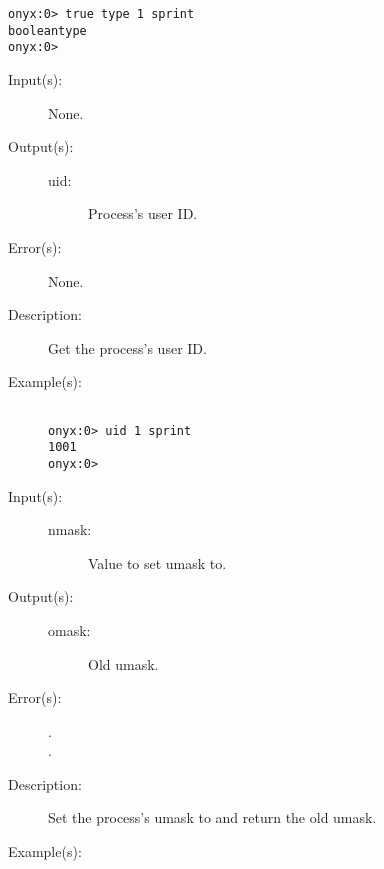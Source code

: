 \begin{description}
\begin{description}
\begin{verbatim}
onyx:0> true type 1 sprint
booleantype
onyx:0>
		\end{verbatim}
	\end{description}
\label{systemdict:uid}
\item[{\onyxop{--}{uid}{uid}}: ]
	\begin{description}\item[]
	\item[Input(s): ] None.
	\item[Output(s): ]
		\begin{description}\item[]
		\item[uid: ]
			Process's user ID.
		\end{description}
	\item[Error(s): ] None.
	\item[Description: ]
		Get the process's user ID.
	\item[Example(s): ]\begin{verbatim}

onyx:0> uid 1 sprint
1001
onyx:0>
		\end{verbatim}
	\end{description}
\label{systemdict:umask}
\item[{\onyxop{nmask}{umask}{omask}}: ]
	\begin{description}\item[]
	\item[Input(s): ]
		\begin{description}\item[]
		\item[nmask: ]
			Value to set umask to.
		\end{description}
	\item[Output(s): ]
		\begin{description}\item[]
		\item[omask: ]
			Old umask.
		\end{description}
	\item[Error(s): ]
		\begin{description}\item[]
		\item[.]
		\item[.]
		\end{description}
	\item[Description: ]
		Set the process's umask to  and return the old
		umask.
	\item[Example(s): ]\begin{verbatim}


\end{verbatim}
\end{description}
\end{description}
